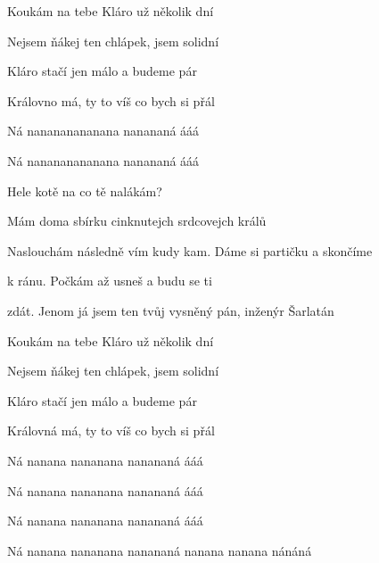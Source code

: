 \begin{song}
Koukám na tebe Kláro už několik dní   \par
{}Nejsem ňákej ten chlápek, jsem solidní   \par
{}Kláro stačí jen málo a budeme pár   \par
{}Královno má, ty to víš co bych si přál    \par

\bigskip

Ná nanananananana nanananá ááá \par
{}Ná nanananananana nanananá ááá \par

\bigskip

Hele kotě na co tě nalákám? \par
{} Mám doma sbírku cinknutejch srdcovejch králů \par
{}Naslouchám následně vím kudy kam.  Dáme si partičku a skončíme \par
{}k ránu. Počkám až usneš  a budu se ti \par
{}zdát. Jenom já jsem ten tvůj vysněný pán, inženýr Šarlatán \par

\bigskip

Koukám na tebe Kláro už několik dní   \par
{}Nejsem ňákej ten chlápek, jsem solidní   \par
{}Kláro stačí jen málo a budeme pár   \par
{}Královná má, ty to víš co bych si přál   \par

\bigskip

Ná nanana nananana nanananá ááá \par
{}Ná nanana nananana nanananá ááá \par
{}Ná nanana nananana nanananá ááá \par
{}Ná nanana nananana nanananá nanana nanana nánáná \par

\end{song}
